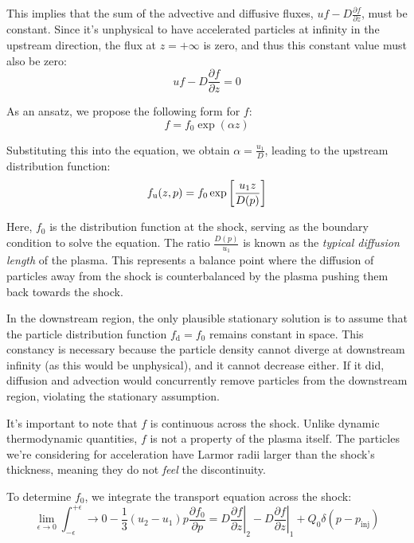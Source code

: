 This implies that the sum of the advective and diffusive fluxes, \( uf - D\frac{\partial f}{\partial z} \), must be constant. Since it's unphysical to have accelerated particles at infinity in the upstream direction, the flux at \( z = +\infty \) is zero, and thus this constant value must also be zero:
%
\begin{equation}
uf - D \frac{\partial f}{\partial z} = 0
\end{equation}

As an ansatz, we propose the following form for \( f \):
%
\begin{equation}
f = f_0 \exp\left(\alpha z\right)
\end{equation}

Substituting this into the equation, we obtain \( \alpha = \frac{u_1}{D} \), leading to the upstream distribution function:
%
\begin{equation}
f_{\rm u}(z, p) = f_0 \exp \left[ \frac{u_1 z}{D(p)} \right]
\end{equation}

Here, \( f_0 \) is the distribution function at the shock, serving as the boundary condition to solve the equation. The ratio \( \frac{D(p)}{u_1} \) is known as the \emph{typical diffusion length} of the plasma. This represents a balance point where the diffusion of particles away from the shock is counterbalanced by the plasma pushing them back towards the shock.

In the downstream region, the only plausible stationary solution is to assume that the particle distribution function \( f_{\text{d}} = f_0 \) remains constant in space. This constancy is necessary because the particle density cannot diverge at downstream infinity (as this would be unphysical), and it cannot decrease either. If it did, diffusion and advection would concurrently remove particles from the downstream region, violating the stationary assumption.

It's important to note that \( f \) is continuous across the shock. Unlike dynamic thermodynamic quantities, \( f \) is not a property of the plasma itself. The particles we're considering for acceleration have Larmor radii larger than the shock's thickness, meaning they do not \emph{feel} the discontinuity.

To determine \( f_0 \), we integrate the transport equation across the shock:
%
\begin{equation}
\lim_{\epsilon \rightarrow 0} \int_{-\epsilon}^{+\epsilon} \rightarrow 0 - \frac{1}{3}(u_2 - u_1) p \frac{\partial f_0}{\partial p} = D \left. \frac{\partial f}{\partial z} \right|_2 - D \left. \frac{\partial f}{\partial z} \right|_1 + Q_0 \delta (p-p_{\text{inj}})
\end{equation}

